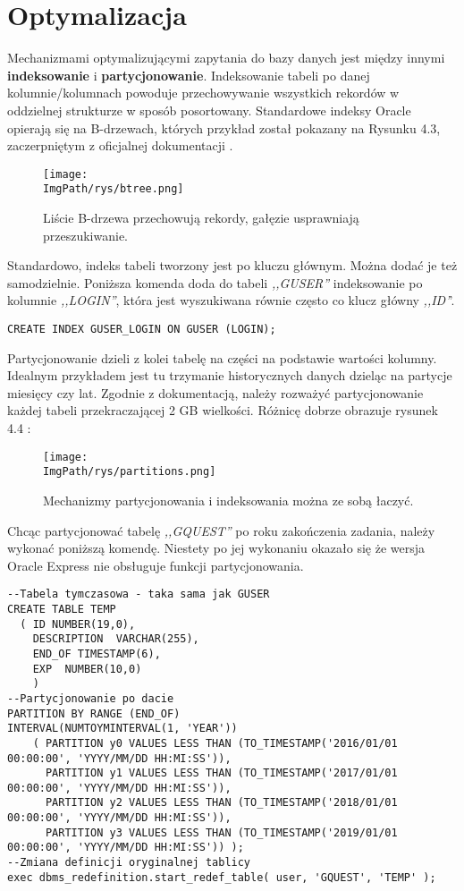 \documentclass[a4paper,12pt,twoside,openany]{report}
\newcommand{\ImgPath}{.}
\begin{document}
\section{Optymalizacja}
Mechanizmami optymalizującymi zapytania do bazy danych jest między innymi \textbf{indeksowanie} i \textbf{partycjonowanie}. Indeksowanie tabeli po danej kolumnie/kolumnach powoduje przechowywanie wszystkich rekordów w oddzielnej strukturze w sposób posortowany. Standardowe indeksy Oracle opierają się na B-drzewach, których przykład został pokazany na Rysunku 4.3, zaczerpniętym z oficjalnej dokumentacji \cite{Oracle2}.
				\begin{figure}[!htbp]
					\begin{center}
						\centering
						\texttt{[image: \\ImgPath/rys/btree.png]}
					\end{center}
					\caption{Liście B-drzewa przechowują rekordy, gałęzie usprawniają przeszukiwanie.}
					\label{UMLTS}
				\end{figure}
Standardowo, indeks tabeli tworzony jest po kluczu głównym. Można dodać je też samodzielnie. Poniższa komenda doda do tabeli \textit{,,GUSER''} indeksowanie po kolumnie \textit{,,LOGIN''}, która jest wyszukiwana równie często co klucz główny \textit{,,ID'}'.
\begin{lstlisting}
CREATE INDEX GUSER_LOGIN ON GUSER (LOGIN);
\end{lstlisting}
Partycjonowanie dzieli z kolei tabelę na części na podstawie wartości kolumny. Idealnym przykładem jest tu trzymanie historycznych danych  dzieląc na partycje miesięcy czy lat. Zgodnie z dokumentacją, należy rozważyć partycjonowanie każdej tabeli przekraczającej 2 GB wielkości. Różnicę dobrze obrazuje rysunek 4.4 \cite{Oracle2}:
				\begin{figure}[!htbp]
					\begin{center}
						\centering
						\texttt{[image: \\ImgPath/rys/partitions.png]}
					\end{center}
					\caption{Mechanizmy partycjonowania i indeksowania można ze sobą łaczyć.}
					\label{UMLTS}
				\end{figure}
Chcąc partycjonować tabelę \textit{,,GQUEST''} po roku zakończenia zadania, należy wykonać poniższą komendę. Niestety po jej wykonaniu okazało się że wersja Oracle Express nie obsługuje funkcji partycjonowania.

\begin{lstlisting}
--Tabela tymczasowa - taka sama jak GUSER
CREATE TABLE TEMP
  ( ID NUMBER(19,0),
    DESCRIPTION  VARCHAR(255),
    END_OF TIMESTAMP(6),
    EXP  NUMBER(10,0)
    )
--Partycjonowanie po dacie
PARTITION BY RANGE (END_OF) 
INTERVAL(NUMTOYMINTERVAL(1, 'YEAR'))
    ( PARTITION y0 VALUES LESS THAN (TO_TIMESTAMP('2016/01/01 00:00:00', 'YYYY/MM/DD HH:MI:SS')),
      PARTITION y1 VALUES LESS THAN (TO_TIMESTAMP('2017/01/01 00:00:00', 'YYYY/MM/DD HH:MI:SS')),
      PARTITION y2 VALUES LESS THAN (TO_TIMESTAMP('2018/01/01 00:00:00', 'YYYY/MM/DD HH:MI:SS')),
      PARTITION y3 VALUES LESS THAN (TO_TIMESTAMP('2019/01/01 00:00:00', 'YYYY/MM/DD HH:MI:SS')) );
--Zmiana definicji oryginalnej tablicy    
exec dbms_redefinition.start_redef_table( user, 'GQUEST', 'TEMP' );
\end{lstlisting}
\end{document}

